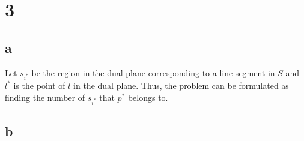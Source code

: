 \section*{3}
\subsection*{a}
Let $s_{i^*}$ be the region in the dual plane corresponding to a line segment in $S$ and $l^*$ is the point
of $l$ in the dual plane.  Thus, the problem can be formulated as finding the number
of $s_{i^*}$ that $p^*$ belongs to.

\subsection*{b}
